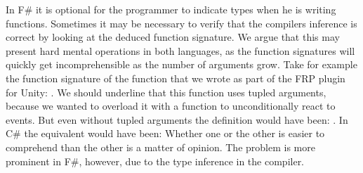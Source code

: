 In F\# it is optional for the programmer to indicate types when he is writing functions. Sometimes it may be necessary to verify that the compilers inference is correct by looking at the deduced function signature. We argue that this may present hard mental operations in both languages, as the function signatures will quickly get incomprehensible as the number of arguments grow. Take for example the function signature of the  function that we wrote as part of the \gls{FRP} plugin for Unity: 
\newline
{}.\newline
We should underline that this function uses tupled arguments, because we wanted to overload it with a function to unconditionally react to events. But even without tupled arguments the definition would have been:\newline
{}.\newline
In C\# the equivalent would have been:\newline
{}\newline
Whether one or the other is easier to comprehend than the other is a matter of opinion. The problem is more prominent in F\#, however, due to the type inference in the compiler.